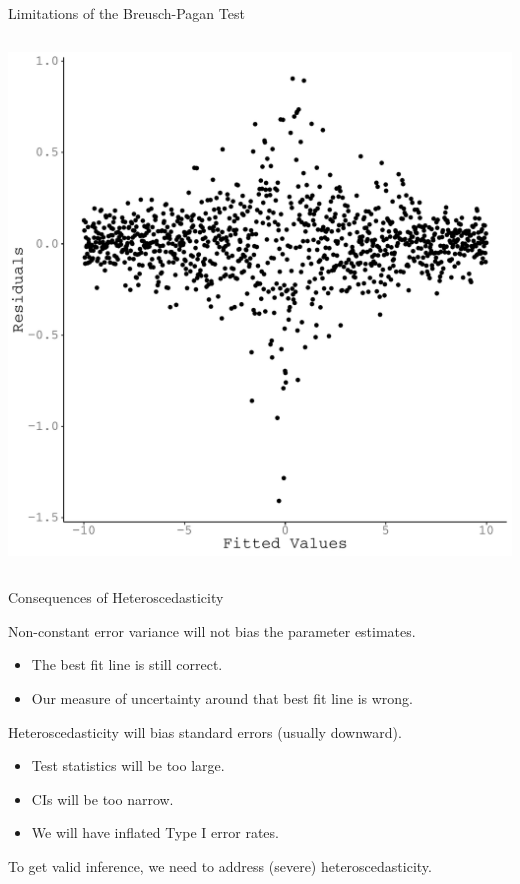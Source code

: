\documentclass{beamer}\usepackage[]{graphicx}\usepackage[]{color}
\makeatletter
\def\maxwidth{ %
  \ifdim\Gin@nat@width>\linewidth
    \linewidth
  \else
    \Gin@nat@width
  \fi
}
\newenvironment{knitrout}{}{} %
\makeatother
\begin{document}
\begin{frame}{Limitations of the Breusch-Pagan Test}
\begin{columns}
\begin{column}{0.5\textwidth}
\begin{knitrout}
{\centering \includegraphics[width=\maxwidth]{figure/unnamed-chunk-9-1} 

}



\end{knitrout}

    \end{column}
  \end{columns}
  
\end{frame}
  
\watermarkon %

\begin{frame}{Consequences of Heteroscedasticity}
  
  Non-constant error variance will not bias the parameter estimates.
  \begin{itemize}
  \item The best fit line is still correct.
  \item Our measure of uncertainty around that best fit line is wrong.
  \end{itemize}
  \vb
  Heteroscedasticity will bias standard errors (usually downward).
  \begin{itemize}
  \item Test statistics will be too large.
  \item CIs will be too narrow.
  \item We will have inflated Type I error rates.
  \end{itemize}
  \vb
  To get valid inference, we need to address (severe) heteroscedasticity.
  
\end{frame}
\end{document}
